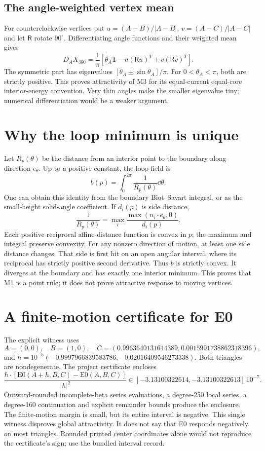 \documentclass[11pt,oneside,openany]{book}
\begin{document}
\subsection{The angle-weighted vertex mean}
For counterclockwise vertices put
$u=(A-B)/|A-B|$, $v=(A-C)/|A-C|$ and let $\mathsf R$ rotate $90^\circ$.
Differentiating angle functions and their weighted mean gives
\[
D_A X_{360}
=\frac1\pi[\theta_A\mathbf1-u(\mathsf Ru)^T+v(\mathsf Rv)^T].
\]
The symmetric part has eigenvalues
$[\theta_A\pm\sin\theta_A]/\pi$.
For $0<\theta_A<\pi$, both are strictly positive.
This proves attractivity of M3 for its equal-current equal-core
interior-energy convention. Very thin angles make the smaller
eigenvalue tiny; numerical differentiation would be a weaker argument.

\section{Why the loop minimum is unique}
Let $R_p(\theta)$ be the distance from an interior point to the boundary
along direction $e_\theta$. Up to a positive constant, the loop
field is
\[
b(p)=\int_0^{2\pi}\frac1{R_p(\theta)}\dd\theta.
\]
One can obtain this identity from the boundary Biot--Savart integral,
or as the small-height solid-angle coefficient.
If $d_i(p)$ is side distance,
\[
\frac1{R_p(\theta)}
=\max_i\frac{\max(n_i\cdot e_\theta,0)}{d_i(p)}.
\]
Each positive reciprocal affine-distance function is convex in $p$;
the maximum and integral preserve convexity.
For any nonzero direction of motion, at least one side distance
changes. That side is first hit on an open angular interval, where
its reciprocal has strictly positive second derivative.
Thus $b$ is strictly convex. It diverges at the boundary and
has exactly one interior minimum. This proves that M1 is a point
rule; it does not prove attractive response to moving vertices.

\section{A finite-motion certificate for E0}
The explicit witness uses
\[
A=(0,0),\quad B=(1,0),\quad
C=(0.9963640131614389,0.0015991738862318396),
\]
and
$h=10^{-5}(-0.9997966839583786,-0.02016409546273338)$.
Both triangles are nondegenerate.
The project certificate encloses
\[
\frac{h\cdot[\mathrm{E0}(A+h,B,C)-\mathrm{E0}(A,B,C)]}{|h|^2}
\in[-3.13100322614,-3.13100322613]\,10^{-7}.
\]
Outward-rounded incomplete-beta series evaluations, a degree-250
local series, a degree-160 continuation and explicit remainder
bounds produce the enclosure. The finite-motion margin is small,
but its entire interval is negative. This single witness disproves
global attractivity. It does not say that E0 responds negatively
on most triangles. Rounded printed center coordinates alone would
not reproduce the certificate's sign; use the bundled interval record.
\end{document}
